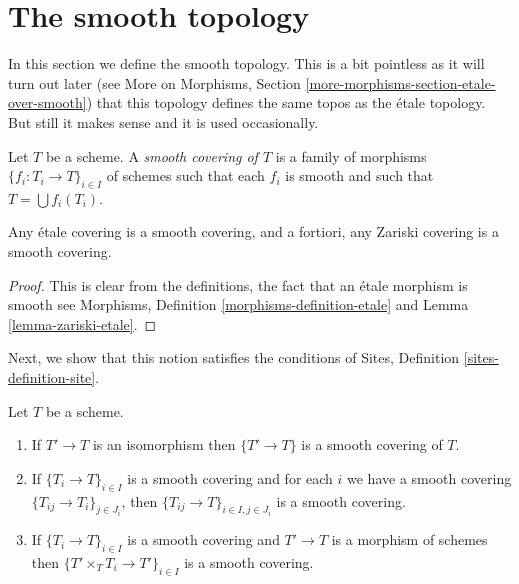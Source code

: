 \section{The smooth topology}
\label{section-smooth}

\noindent
In this section we define the smooth topology.
This is a bit pointless as it will turn out later (see
More on Morphisms, Section \ref{more-morphisms-section-etale-over-smooth})
that this topology defines the same topos as the
\'etale topology. But still it makes sense and it is used
occasionally.

\begin{definition}
\label{definition-smooth-covering}
Let $T$ be a scheme. A {\it smooth covering of $T$} is a family
of morphisms $\{f_i : T_i \to T\}_{i \in I}$ of schemes
such that each $f_i$ is smooth and such
that $T = \bigcup f_i(T_i)$.
\end{definition}

\begin{lemma}
\label{lemma-zariski-etale-smooth}
Any \'etale covering is a smooth covering, and a fortiori,
any Zariski covering is a smooth covering.
\end{lemma}

\begin{proof}
This is clear from the definitions, the fact that an \'etale morphism is
smooth see
Morphisms, Definition \ref{morphisms-definition-etale}
and Lemma \ref{lemma-zariski-etale}.
\end{proof}

\noindent
Next, we show that this notion satisfies the conditions of
Sites, Definition \ref{sites-definition-site}.

\begin{lemma}
\label{lemma-smooth}
Let $T$ be a scheme.
\begin{enumerate}
\item If $T' \to T$ is an isomorphism then $\{T' \to T\}$
is a smooth covering of $T$.
\item If $\{T_i \to T\}_{i\in I}$ is a smooth covering and for each
$i$ we have a smooth covering $\{T_{ij} \to T_i\}_{j\in J_i}$, then
$\{T_{ij} \to T\}_{i \in I, j\in J_i}$ is a smooth covering.
\item If $\{T_i \to T\}_{i\in I}$ is a smooth covering
and $T' \to T$ is a morphism of schemes then
$\{T' \times_T T_i \to T'\}_{i\in I}$ is a smooth covering.
\end{enumerate}
\end{lemma}

